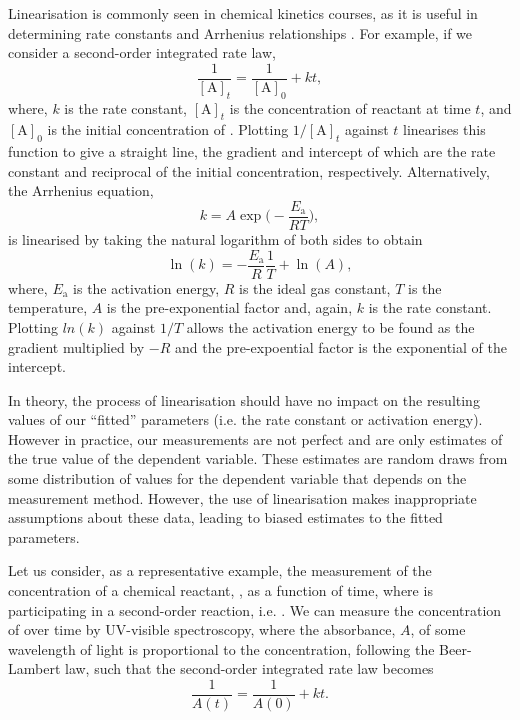 \documentclass[reprint,superscriptaddress,nobibnotes,amsmath,amssymb]{revtex4-2}
\begin{document}
Linearisation is commonly seen in chemical kinetics courses, as it is useful in determining rate constants and Arrhenius relationships \cite{perrin_linear_2017,hites_calculating_2017}.
For example, if we consider a second-order integrated rate law,
%
\begin{equation}
    \frac{1}{[\mathrm{A}]_t} = \frac{1}{[\mathrm{A}]_0} + kt,
\end{equation}
%
where, $k$ is the rate constant, $[\mathrm{A}]_t$ is the concentration of reactant  at time $t$, and $[\mathrm{A}]_0$ is the initial concentration of . 
Plotting $1/[\mathrm{A}]_t$ against $t$ linearises this function to give a straight line, the gradient and intercept of which are the rate constant and reciprocal of the initial concentration, respectively. 
Alternatively, the Arrhenius equation, 
%
\begin{equation}
    k = A\exp{\bigg(-\frac{E_\mathrm{a}}{RT}\bigg)},
\end{equation}
%
is linearised by taking the natural logarithm of both sides to obtain
%
\begin{equation}
    \ln{(k)} = -\frac{E_{\mathrm{a}}}{R}\frac{1}{T} + \ln{(A)},
\end{equation}
%
where, $E_{\mathrm{a}}$ is the activation energy, $R$ is the ideal gas constant, $T$ is the temperature, $A$ is the pre-exponential factor and, again, $k$ is the rate constant.
Plotting $ln{(k)}$ against $1/T$ allows the activation energy to be found as the gradient multiplied by $-R$ and the pre-expoential factor is the exponential of the intercept.

In theory, the process of linearisation should have no impact on the resulting values of our ``fitted'' parameters (i.e. the rate constant or activation energy). 
However in practice, our measurements are not perfect and are only estimates of the true value of the dependent variable.
These estimates are random draws from some distribution of values for the dependent variable that depends on the measurement method. 
However, the use of linearisation makes inappropriate assumptions about these data, leading to biased estimates to the fitted parameters. 

Let us consider, as a representative example, the measurement of the concentration of a chemical reactant, , as a function of time, where  is participating in a second-order reaction, i.e. . 
We can measure the concentration of  over time by UV-visible spectroscopy, where the absorbance, $A$, of some wavelength of light is proportional to the concentration, following the Beer-Lambert law, such that the second-order integrated rate law becomes
%
\begin{equation}
    \frac{1}{A(t)} = \frac{1}{A(0)} + kt.
\end{equation}
%
\end{document}
